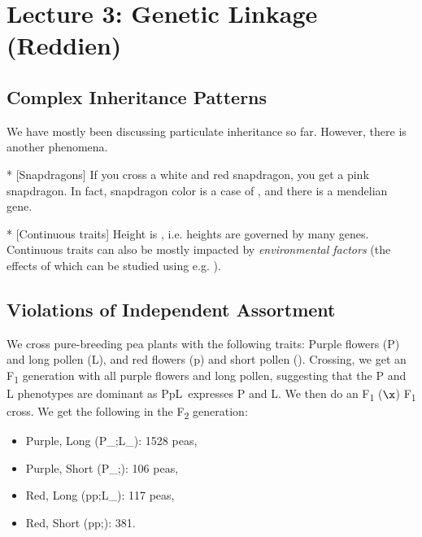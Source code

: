 \section*{Lecture 3: Genetic Linkage (Reddien)}
\setcounter{section}{3}
\setcounter{defn}{0}
\setcounter{subsection}{0}
\setcounter{defncontainer}{0}

\subsection{Complex Inheritance Patterns}

We have mostly been discussing particulate inheritance so far. However, there is another phenomena. 

\begin{exm}*
	[Snapdragons] 
	If you cross a white and red snapdragon, you get a pink snapdragon. 
	In fact, snapdragon color is a case of , and there is a mendelian gene.
\end{exm}

\begin{exm}*
	[Continuous traits]
	Height is , i.e. heights are governed by many genes. Continuous traits can also be mostly impacted by \emph{environmental factors} (the effects of which can be studied using e.g. ).
\end{exm}

\subsection{Violations of Independent Assortment}

\begin{exper}
	We cross pure-breeding pea plants with the following traits: Purple flowers (P) and long pollen (L), and red flowers (p) and short pollen (\ell).
	Crossing, we get an F\textsubscript1 generation with all purple flowers and long pollen, suggesting that the P and L phenotypes are dominant as PpL\ell\, expresses P and L. We then do an F\textsubscript1 ($\x$) F\textsubscript1 cross. We get the following in the F\textsubscript2 generation:
	\begin{itemize}
		\item Purple, Long (P\_;L\_): 1528 peas,
		\item Purple, Short (P\_;\ell\ell): 106 peas,
		\item Red, Long (pp;L\_): 117 peas,
		\item Red, Short (pp;\ell\ell): 381.
	\end{itemize}
\end{exper}

